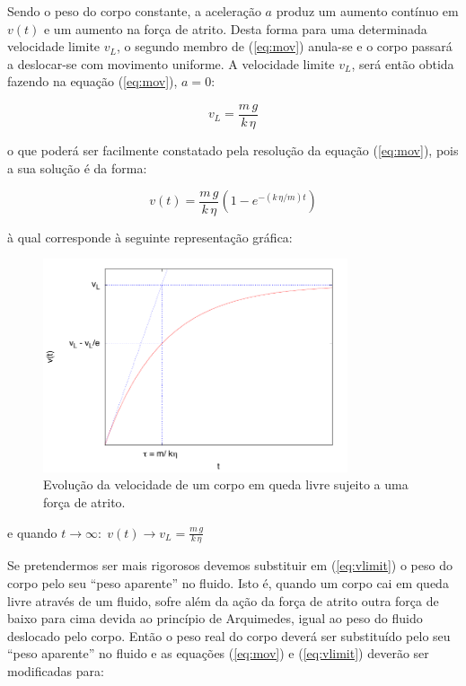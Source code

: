 \documentclass[a4paper,twoside,12pt]{article}      %
\begin{document}
Sendo o peso do corpo constante, a aceleração $a$ produz um aumento contínuo em $v(t)$ e um aumento na força de atrito. Desta forma para uma determinada velocidade limite $v_L$, o segundo membro de (\ref{eq:mov}) anula-se e o corpo passará a deslocar-se com movimento uniforme. A velocidade limite $v_L$, será então obtida fazendo na equação (\ref{eq:mov}), $a= 0$:

\begin{equation}
	\label{eq:vlimit}
	v_L = \frac{m\,g}{k  \, \eta}
\end{equation}

o que poderá ser facilmente constatado pela resolução da equação (\ref{eq:mov}), pois a sua solução é da forma:

\begin{equation}
	\label{eq:vlimita}
	v(t) = \frac{m\,g}{k  \, \eta} (1 - e^{- (k\,\eta / m) t})
\end{equation}

à qual corresponde à seguinte representação gráfica:
\begin{figure}
	[!htb]  \centering 
	\includegraphics[width=0.8\textwidth]{./plote}
	\caption{ Evolução da velocidade de um corpo em queda livre sujeito a uma força de atrito. \label{fig:vLim}} 
\end{figure}

e quando $t \to \infty :\; v(t) \to v_L = \frac{m\,g}{k  \, \eta} $

Se pretendermos ser mais rigorosos devemos substituir  em (\ref{eq:vlimit}) o peso do corpo pelo seu “peso aparente” no fluido. Isto é, quando um corpo cai em queda livre através de um fluido, sofre além da ação da força de atrito outra força de baixo para cima devida ao princípio de Arquimedes, igual ao peso do fluido deslocado pelo corpo. Então o peso real do corpo deverá ser substituído pelo seu “peso aparente” no fluido e as equações (\ref{eq:mov}) e (\ref{eq:vlimit}) deverão ser modificadas para:
\end{document}
